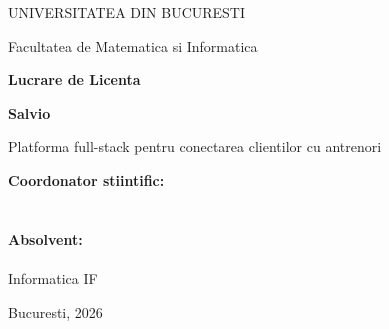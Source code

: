 \begin{titlepage}
    \centering

    {\Large UNIVERSITATEA DIN BUCURESTI \par}
    {\Large Facultatea de Matematica si Informatica \par}
    \vspace{2.0cm}

    {\Huge\bfseries Lucrare de Licenta \par}
    \vspace{1.2cm}

    {\Large\bfseries Salvio \par}
    \vspace{0.3cm}
    {\large Platforma full-stack pentru conectarea clientilor cu antrenori \par}

    \vfill

    \begin{flushleft}
        \large
        \textbf{Coordonator stiintific:} \\
        [Nume coordonator] \\
        [Titlu didactic] \\
        \vspace{0.8cm}
        \textbf{Absolvent:} \\
        [Nume student] \\
        Informatica IF
    \end{flushleft}

    \vfill

    {\large Bucuresti, 2026 \par}
\end{titlepage}

\clearpage
